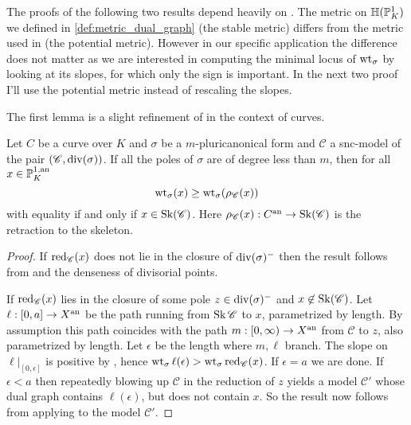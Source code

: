 The proofs of the following two results depend heavily on \cite[thm.\ 3.2.3]{bakerWeightFunctionsBerkovich2016}. 
	The metric on $\mathbb{H}(\mathbb{P}^{1}_K)$ we defined in \cref{def:metric_dual_graph} (the stable metric) differs from the metric used in \cite{bakerWeightFunctionsBerkovich2016} (the potential metric). 
	However in our specific application the difference does not matter as we are interested in computing the minimal locus of $\operatorname{wt}_\sigma$ by looking at its slopes, for which only the sign is important.
	In the next two proof I'll use the potential metric instead of rescaling the slopes.

	The first lemma is a slight refinement of \cite[prop.\ 4.4.4]{mustataWeightFunctionsNonArchimedean2015} in the context of curves.
	\begin{lemma}\label{lem:well_behaved_pole_weight}
		Let $C$ be a curve over $K$ and $\sigma$ be a $m$-pluricanonical form and $\mathscr C$ a snc-model of the pair $(\mathscr C, \operatorname{div}(\sigma))$.  
	If all the poles of $\sigma$ are of degree less than $m$, then for all $x \in \mathbb{P}^{1, \text{an}}_K$ \[
		\operatorname{wt}_\sigma(x) \ge \operatorname{wt}_\sigma(\rho_{\mathscr C}(x))
	\] 
	with equality if and only if $x \in \operatorname{Sk}(\mathscr C)$. 
	Here $\rho_{\mathscr C}(x): C{}^{\text{an}} \to \operatorname{Sk}(\mathscr C)$ is the retraction to the skeleton.
\end{lemma}
\begin{proof}
	If $\operatorname{red}_{\mathscr C}(x)$ does not lie in the closure of $\operatorname{div}(\sigma)^{-}$ then the result follows from \cite[prop.\ 4.4.4.(2)]{mustataWeightFunctionsNonArchimedean2015} and the denseness of divisorial points. 

	If $\operatorname{red}_{\mathscr C}(x)$ lies in the closure of some pole $z \in \operatorname{div}(\sigma)^{-}$ and $x \not\in \operatorname{Sk}(\mathscr C)$. 
	Let $\ell: [0, a] \to X{}^{\text{an}}$ be the path running from $\operatorname{Sk} \mathscr C$ to $x$, parametrized by length. 
	By assumption this path coincides with the path $m: [0, \infty) \to X{}^{\text{an}}$ from $\mathscr C$ to $z$, also parametrized by length.
	Let $\epsilon$ be the length where $m, \ell$ branch. 
	The slope on  $\ell|_{[0, \epsilon]}$ is positive by \cite[thm.\ 3.2.3.(2)]{bakerWeightFunctionsBerkovich2016}, hence $\wt_\sigma \ell(\epsilon) > \wt_\sigma \red_{\mathscr C}(x)$.
	If $\epsilon = a$ we are done. 
	If $\epsilon < a$ then repeatedly blowing up $\mathscr C$ in the reduction of $z$ yields a model $\mathscr C'$ whose dual graph contains $\ell(\epsilon)$, but does not contain $x$.
	So the result now follows from applying \cite[prop.\ 4.4.4.(2)]{mustataWeightFunctionsNonArchimedean2015} to the model $\mathscr C'$. 
\end{proof}

